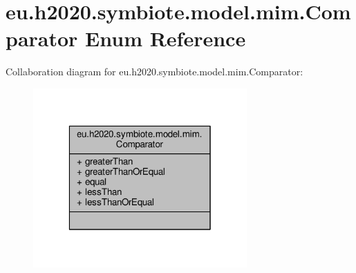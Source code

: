 \hypertarget{enumeu_1_1h2020_1_1symbiote_1_1model_1_1mim_1_1Comparator}{}\section{eu.\+h2020.\+symbiote.\+model.\+mim.\+Comparator Enum Reference}
\label{enumeu_1_1h2020_1_1symbiote_1_1model_1_1mim_1_1Comparator}


Collaboration diagram for eu.\+h2020.\+symbiote.\+model.\+mim.\+Comparator\+:\nopagebreak
\begin{figure}[H]
\begin{center}
\leavevmode
\includegraphics[width=232pt]{enumeu_1_1h2020_1_1symbiote_1_1model_1_1mim_1_1Comparator__coll__graph}
\end{center}
\end{figure}
